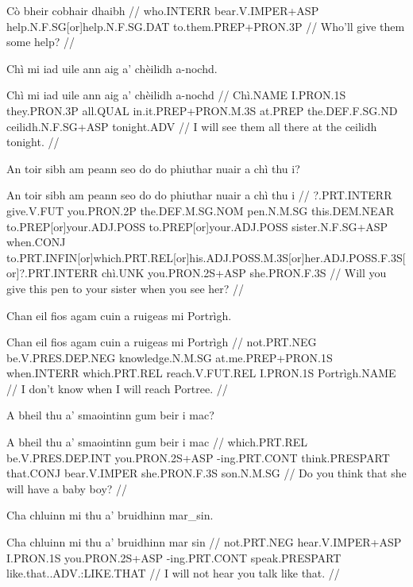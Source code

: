 \documentclass[a4paper,10pt]{article}
\begin{document}
\vspace{4mm}
\gla Cò bheir cobhair dhaibh  //
\glb who.INTERR bear.V.IMPER+ASP help.N.F.SG[or]help.N.F.SG.DAT to.them.PREP+PRON.3P  //
\glft Who'll give them some help? //
\endgl
\xe

\ex
\begingl
\glpre Chì mi iad uile ann aig a' chèilidh a-nochd. 

\vspace{4mm}
\gla Chì mi iad uile ann aig a' chèilidh a-nochd  //
\glb Chì.NAME I.PRON.1S they.PRON.3P all.QUAL in.it.PREP+PRON.M.3S at.PREP the.DEF.F.SG.ND ceilidh.N.F.SG+ASP tonight.ADV  //
\glft I will see them all there at the ceilidh tonight. //
\endgl
\xe

\ex
\begingl
\glpre An toir sibh am peann seo do do phiuthar nuair a chì thu i? 

\vspace{4mm}
\gla An toir sibh am peann seo do do phiuthar nuair a chì thu i  //
\glb ?.PRT.INTERR give.V.FUT you.PRON.2P the.DEF.M.SG.NOM pen.N.M.SG this.DEM.NEAR to.PREP[or]your.ADJ.POSS to.PREP[or]your.ADJ.POSS sister.N.F.SG+ASP when.CONJ to.PRT.INFIN[or]which.PRT.REL[or]his.ADJ.POSS.M.3S[or]her.ADJ.POSS.F.3S[or]?.PRT.INTERR chì.UNK you.PRON.2S+ASP she.PRON.F.3S  //
\glft Will you give this pen to your sister when you see her? //
\endgl
\xe

\ex
\begingl
\glpre Chan eil fios agam cuin a ruigeas mi Portrìgh. 

\vspace{4mm}
\gla Chan eil fios agam cuin a ruigeas mi Portrìgh  //
\glb not.PRT.NEG be.V.PRES.DEP.NEG knowledge.N.M.SG at.me.PREP+PRON.1S when.INTERR which.PRT.REL reach.V.FUT.REL I.PRON.1S Portrìgh.NAME  //
\glft I don't know when I will reach Portree. //
\endgl
\xe

\ex
\begingl
\glpre A bheil thu a' smaointinn gum beir i mac? 

\vspace{4mm}
\gla A bheil thu a' smaointinn gum beir i mac  //
\glb which.PRT.REL be.V.PRES.DEP.INT you.PRON.2S+ASP -ing.PRT.CONT think.PRESPART that.CONJ bear.V.IMPER she.PRON.F.3S son.N.M.SG  //
\glft Do you think that she will have a baby boy? //
\endgl
\xe

\ex
\begingl
\glpre Cha chluinn mi thu a' bruidhinn mar\_sin. 

\vspace{4mm}
\gla Cha chluinn mi thu a' bruidhinn {mar sin}  //
\glb not.PRT.NEG hear.V.IMPER+ASP I.PRON.1S you.PRON.2S+ASP -ing.PRT.CONT speak.PRESPART like.that..ADV.:LIKE.THAT  //
\glft I will not hear you talk like that. //
\endgl
\xe
\end{document}
